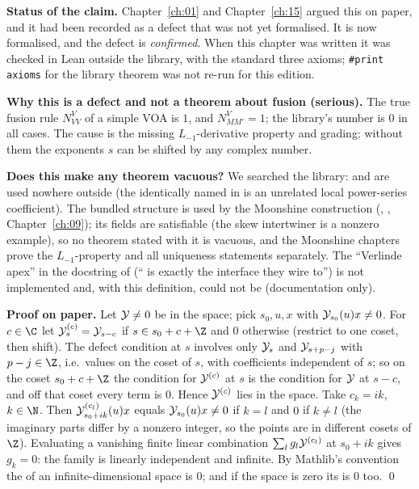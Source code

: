 \begin{dictionary}
\textbf{Status of the claim.} Chapter~\ref{ch:01} and Chapter~\ref{ch:15} argued this on paper, and it
had been recorded as a defect that was not yet formalised. It is now formalised, and the defect is \emph{confirmed}. When this chapter was written it was
checked in Lean outside the library, with the standard three axioms; \texttt{\#print axioms} for the library theorem was not
re-run for this edition.

\textbf{Why this is a defect and not a theorem about fusion (serious).} The true fusion rule $N_{VV}^V$ of a simple VOA is $1$,
and $N_{MM'}^V = 1$; the library's number is $0$ in all cases. The cause is the missing $L_{-1}$-derivative property and
grading: without them the exponents $s$ can be shifted by any complex number.

\textbf{Does this make any theorem vacuous?} We searched the library:  and  are used
nowhere outside  (the identically named  in
 is an unrelated local power-series coefficient). The
bundled  structure is used by the Moonshine construction (,
, Chapter~\ref{ch:09}); its fields are satisfiable (the skew intertwiner is a nonzero
example), so no theorem stated with it is vacuous, and the Moonshine chapters prove the $L_{-1}$-property and all
uniqueness statements separately. The ``Verlinde apex'' in the docstring of  (`` is
exactly the interface they wire to'') is not implemented and, with this definition, could not be (documentation only).
\end{dictionary}

\textbf{Proof on paper.} Let $\mathcal{Y}\neq0$ be in the space; pick $s_0,u,x$ with $\mathcal{Y}_{s_0}(u)x\neq0$. For $c\in\C$ let
$\mathcal{Y}^{(c)}_s = \mathcal{Y}_{s-c}$ if $s\in s_0+c+\Z$ and $0$ otherwise (restrict to one coset, then shift). The defect
condition at $s$ involves only $\mathcal{Y}_s$ and $\mathcal{Y}_{s+p-j}$ with $p-j\in\Z$, i.e.\ values on the coset of $s$, with
coefficients independent of $s$; so on the coset $s_0+c+\Z$ the condition for $\mathcal{Y}^{(c)}$ at $s$ is the condition for
$\mathcal{Y}$ at $s-c$, and off that coset every term is $0$. Hence $\mathcal{Y}^{(c)}$ lies in the space. Take $c_k = ik$,
$k\in\N$. Then $\mathcal{Y}^{(c_l)}_{s_0+ik}(u)x$ equals $\mathcal{Y}_{s_0}(u)x\neq0$ if $k = l$ and $0$ if $k\neq l$ (the imaginary
parts differ by a nonzero integer, so the points are in different cosets of $\Z$). Evaluating a vanishing finite linear
combination $\sum_l g_l\mathcal{Y}^{(c_l)}$ at $s_0+ik$ gives $g_k = 0$: the family is linearly independent and infinite.
By Mathlib's convention the  of an infinite-dimensional space is $0$; and if the space is zero its
 is $0$ too. \qed

